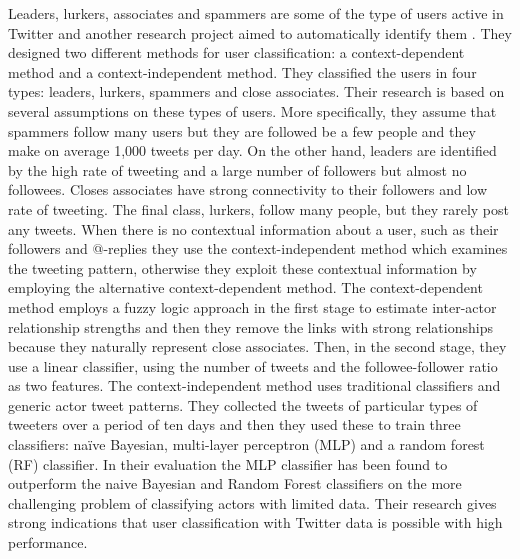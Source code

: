 Leaders, lurkers, associates and spammers are some of the type of users active in Twitter and another research project aimed to automatically identify them \citep{DBLP:journals/snam/FazeenDG11}. They designed two different methods for user classification: a context-dependent method and a context-independent method. They classified the users in four types: leaders, lurkers, spammers and close associates. Their research is based on several assumptions on these types of users. More specifically, they assume that spammers follow many users but they are followed be a few people and they make on average 1,000 tweets per day. On the other hand, leaders are identified by the high rate of tweeting and a large number of followers but almost no followees. Closes associates have strong connectivity to their followers and low rate of tweeting. The final class, lurkers, follow many people, but they rarely post any tweets. When there is no contextual information about a user, such as their followers and @-replies they use the context-independent method which examines the tweeting pattern, otherwise they exploit these contextual information by employing the alternative context-dependent method. The context-dependent method employs a fuzzy logic approach in the first stage to estimate inter-actor relationship strengths and then they remove the links with strong relationships because they naturally represent close associates. Then, in the second stage, they use a linear classifier, using the number of tweets and the followee-follower ratio as two features. The context-independent method uses traditional classifiers and generic actor tweet patterns. They collected the tweets of particular types of tweeters over a period of ten days and then they used these to train three classifiers: naïve Bayesian, multi-layer perceptron (MLP) and a random forest (RF) classifier.  In their evaluation the MLP classifier has been found to outperform the naive Bayesian and Random Forest classifiers on the more challenging problem of classifying actors with limited data. Their research gives strong indications that user classification with Twitter data is possible with high performance.\\\\

